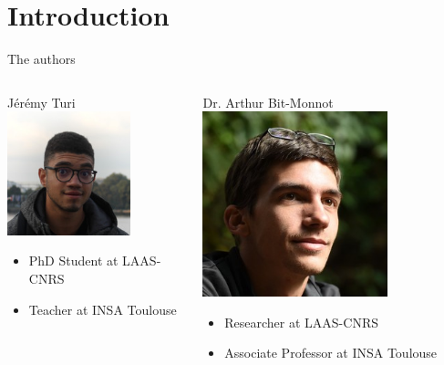 \section{Introduction}

\begin{frame}{The authors}
    \begin{columns}
        \begin{column}{0.5\textwidth}
            Jérémy Turi
            \includegraphics[width = 0.7\textwidth]{images/jeremy.jpeg}
            \begin{itemize}
                \item PhD Student at LAAS-CNRS
                \item Teacher at INSA Toulouse
            \end{itemize}
        \end{column}
        \begin{column}{0.5\textwidth}
            Dr. Arthur Bit-Monnot
            \includegraphics[width = 0.7\textwidth]{images/arthur.jpg}
            \begin{itemize}
                \item Researcher at LAAS-CNRS
                \item Associate Professor at INSA Toulouse
            \end{itemize}
        \end{column}
    \end{columns}
\centering    
\end{frame}

